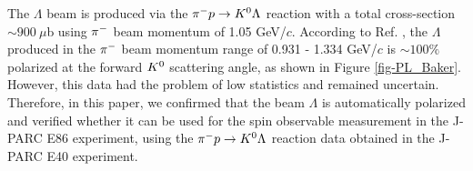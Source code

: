 The $\Lambda$ beam is produced via the $\pi^- p \to K^0 \Lambda$ reaction with a total cross-section $\sim900\ \mu$b \cite{Baker} using $\pi^{-}$ beam momentum of 1.05 GeV/$c$. According to Ref. \cite{Baker}, the $\Lambda$ produced in the $\pi^{-}$ beam momentum range of 0.931 - 1.334 GeV/$c$ is $\sim100\%$ polarized at the forward $K^{0}$ scattering angle, as shown in Figure \ref{fig-PL_Baker}. However, this data had the problem of low statistics and remained uncertain. Therefore, in this paper, we confirmed that the beam $\Lambda$ is automatically polarized and verified whether it can be used for the spin observable measurement in the J-PARC E86 experiment, using the $\pi^- p \to K^0 \Lambda$ reaction data obtained in the J-PARC E40 experiment.

\begin{comment}

Figure \ref{fig-E86setup} shows the experimental setup of J-PARC E86 \cite{Miwa-LpProp}. To reconstruct $\Kz$, $\pP$ and $\pM$ from the $\kzdecay$ decay will be detected by the forward magnetic spectrometer (SKS) \cite{K1.8} and the CATCH system, respectively. The momentum resolution of SKS is $\Delta p/p = 10^{-3}$ (FWHM), which is 10 times better than KURAMA, which should improve the missing mass resolution. As a result, the S/N ratio of $\Lambda$ identification is expected to be improved.


\end{comment}
